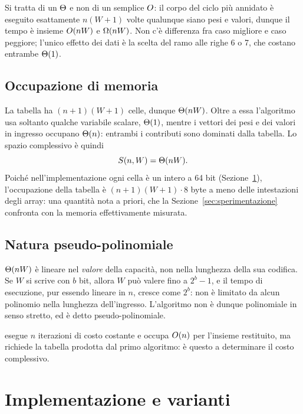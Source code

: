 \documentclass[11pt]{article}
\begin{document}
Si tratta di un $\Theta$ e non di un semplice $O$: il corpo del ciclo pi\`u
annidato \`e eseguito esattamente $n(W+1)$ volte qualunque siano pesi e valori,
dunque il tempo \`e insieme $O(nW)$ e $\Omega(nW)$. Non c'\`e differenza fra caso
migliore e caso peggiore; l'unico effetto dei dati \`e la scelta del ramo alle
righe 6 o 7, che costano entrambe $\Theta(1)$.

\subsection{Occupazione di memoria}
La tabella ha $(n+1)(W+1)$ celle, dunque $\Theta(nW)$. Oltre a essa l'algoritmo usa
soltanto qualche variabile scalare, $\Theta(1)$, mentre i vettori dei pesi e dei
valori in ingresso occupano $\Theta(n)$: entrambi i contributi sono dominati dalla
tabella. Lo spazio complessivo \`e quindi
\[
  S(n,W) = \Theta(nW) .
\]
Poich\'e nell'implementazione ogni cella \`e un intero a 64 bit
(Sezione~\ref{sec:implementazione}), l'occupazione della tabella \`e
$(n+1)(W+1)\cdot 8$ byte a meno delle intestazioni degli array: una quantit\`a
nota a priori, che la Sezione~\ref{sec:sperimentazione} confronta con la memoria
effettivamente misurata.

\subsection{Natura pseudo-polinomiale}
$\Theta(nW)$ \`e lineare nel \emph{valore} della capacit\`a, non nella lunghezza
della sua codifica. Se $W$ si scrive con $b$ bit, allora $W$ pu\`o valere fino a
$2^b - 1$, e il tempo di esecuzione, pur essendo lineare in $n$, cresce come
$2^b$: non \`e limitato da alcun polinomio nella lunghezza dell'ingresso.
L'algoritmo non \`e dunque polinomiale in senso stretto, ed \`e detto
pseudo-polinomiale.

\medskip\noindent
{} esegue $n$ iterazioni di costo costante e occupa
$O(n)$ per l'insieme restituito, ma richiede la tabella prodotta dal primo
algoritmo: \`e questo a determinare il costo complessivo.

\section{Implementazione e varianti}\label{sec:implementazione}
\end{document}
